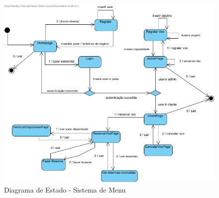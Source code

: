 \documentclass[a4paper,11pt]{scrreprt}
\begin{document}
\begin{landscape}
    \begin{figure}[!ht]
        \centering
        \includegraphics[scale=0.7]{diagramas/MenuUI.jpg}
        \caption{Diagrama de Estado - Sistema de Menu} \label{img:menu_estados}
    \end{figure}
\end{landscape}

\end{document}
